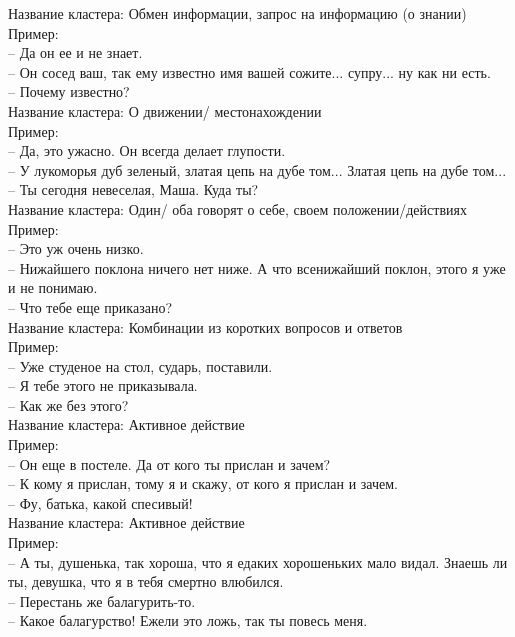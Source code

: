 \documentclass[a4paper,14pt]{article}
\begin{document}
Название кластера: Обмен информации, запрос на информацию (о знании)\\
Пример: \\
-- Да он ее и не знает. \\
-- Он сосед ваш, так ему известно имя вашей сожите... супру... ну как ни есть. \\
-- Почему известно? \\



Название кластера: О движении/ местонахождении\\
Пример: \\
-- Да, это ужасно. Он всегда делает глупости. \\
-- У лукоморья дуб зеленый, златая цепь на дубе том... Златая цепь на дубе том... \\
-- Ты сегодня невеселая, Маша. Куда ты? \\



Название кластера: Один/ оба говорят о себе, своем положении/действиях\\
Пример: \\
-- Это уж очень низко. \\
-- Нижайшего поклона ничего нет ниже. А что всенижайший поклон, этого я уже и не
              понимаю. \\
-- Что тебе еще приказано? \\



Название кластера: Комбинации из коротких вопросов и ответов\\
Пример: \\
-- Уже студеное на стол, сударь, поставили. \\
-- Я тебе этого не приказывала. \\
-- Как же без этого? \\



Название кластера: Активное действие \\
Пример: \\
-- Он еще в постеле. Да от кого ты прислан и зачем? \\
-- К кому я прислан, тому я и скажу, от кого я прислан и зачем. \\
-- Фу, батька, какой спесивый! \\



Название кластера: Активное действие \\
Пример: \\
-- А ты, душенька, так хороша, что я едаких хорошеньких мало видал. Знаешь ли ты,
              девушка, что я в тебя смертно влюбился. \\
-- Перестань же балагурить-то. \\
-- Какое балагурство! Ежели это ложь, так ты повесь меня. \\
\end{document}
